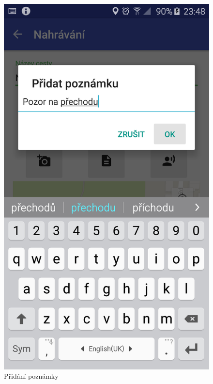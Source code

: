 \documentclass[czech,master,public,dept460,male,java,cpdeclaration]{diploma}
\begin{document}
\begin{figure}[H]
\begin{minipage}{.5\textwidth}
\centering
                \includegraphics[scale=0.14]{img/screen/pridanipoznamky.png}
        \caption{Přidání poznámky}
        \label{fig:pridanipoznamky}
\end{minipage}
\begin{minipage}{.5\textwidth}
  \centering

\end{minipage}
\end{figure}
\end{document}

